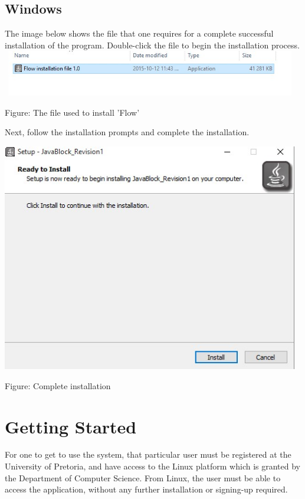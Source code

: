 \documentclass[11pt,a4paper,titlepage]{article}
\begin{document}
		\subsection{Windows}
		
		The image below shows the file that one requires for a complete successful installation of the program. Double-click the file to begin the installation process. \newline \newline
		\includegraphics[width=13cm, height=2cm]{Install1.jpg}		
		\begin{center}
		Figure: The file used to install 'Flow'
		\end{center}
		
			
		Next, follow the installation prompts and complete the installation. \newline
		
		\includegraphics[width=13cm]{Install2.jpg}		
		\begin{center}
		Figure: Complete installation
		\end{center}

\section{Getting Started}
	
	For one to get to use the system, that particular user must be registered at the University of Pretoria, and have access to the Linux platform which is granted by the Department of Computer Science. From Linux, the user must be able to access the application, without any further installation or signing-up required.
\end{document}
